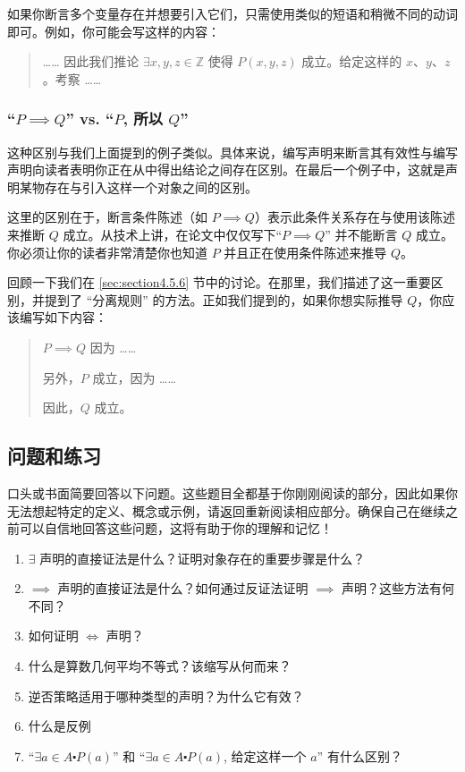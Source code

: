如果你断言多个变量存在并想要引入它们，只需使用类似的短语和稍微不同的动词即可。例如，你可能会写这样的内容：
\begin{quote}
    …… 因此我们推论 $\exists x, y, z \in \mathbb{Z}$ 使得 $P(x, y, z)$ 成立。给定这样的 $x、y、z$。考察 ……
\end{quote}

\subsubsection*{``$P \implies Q$'' vs. ``$P$, 所以 $Q$''}

这种区别与我们上面提到的例子类似。具体来说，编写声明来断言其有效性与编写声明向读者表明你正在从中得出结论之间存在区别。在最后一个例子中，这就是声明某物存在与引入这样一个对象之间的区别。

这里的区别在于，断言条件陈述（如 $P \implies Q$）表示此条件关系存在与使用该陈述来推断 $Q$ 成立。从技术上讲，在论文中仅仅写下``$P \implies Q$'' 并不能断言 $Q$ 成立。你必须让你的读者非常清楚你也知道 $P$ 并且正在使用条件陈述来推导 $Q$。

回顾一下我们在 \ref{sec:section4.5.6} 节中的讨论。在那里，我们描述了这一重要区别，并提到了 ``分离规则'' 的方法。正如我们提到的，如果你想实际推导 $Q$，你应该编写如下内容：
\begin{quote}
    $P \implies Q$ 因为 ……

    另外，$P$ 成立，因为 ……

    因此，$Q$ 成立。
\end{quote}

\subsection{问题和练习}\label{sec:section4.9.9}

口头或书面简要回答以下问题。这些题目全都基于你刚刚阅读的部分，因此如果你无法想起特定的定义、概念或示例，请返回重新阅读相应部分。确保自己在继续之前可以自信地回答这些问题，这将有助于你的理解和记忆！

\begin{enumerate}[label=(\arabic*)]
    \item $\exists$ 声明的直接证法是什么？证明对象存在的重要步骤是什么？
    \item $\implies$ 声明的直接证法是什么？如何通过反证法证明 $\implies$ 声明？这些方法有何不同？
    \item 如何证明 $\iff$ 声明？
    \item 什么是算数几何平均不等式？该缩写从何而来？
    \item 逆否策略适用于哪种类型的声明？为什么它有效？
    \item 什么是反例
    \item ``$\exists a \in A \centerdot P(a)$'' 和 ``$\exists a \in A \centerdot P(a)$, 给定这样一个 $a$'' 有什么区别？
\end{enumerate}

